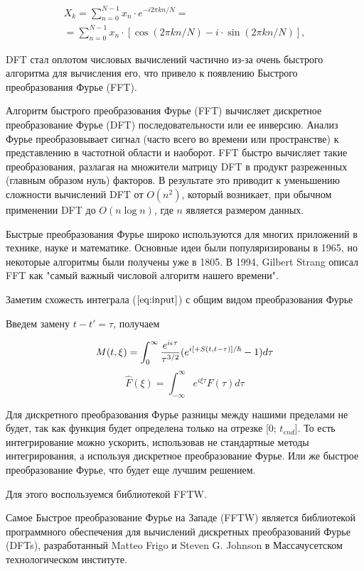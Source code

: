 \documentclass[14pt]{extarticle}
\begin{document}
$$\begin{aligned}X_{k}=\sum _{n=0}^{N-1}x_{n}\cdot e^{-i2\pi kn/N}=\\=\sum _{n=0}^{N-1}x_{n}\cdot [\cos(2\pi kn/N)-i\cdot \sin(2\pi kn/N)],\end{aligned}$$	


DFT стал оплотом числовых вычислений частично из-за очень быстрого алгоритма для вычисления его, что привело к появлению Быстрого преобразования Фурье (FFT).

Алгоритм быстрого преобразования Фурье (FFT) вычисляет дискретное преобразование Фурье (DFT) последовательности или ее инверсию. Анализ Фурье преобразовывает сигнал (часто всего во времени или пространстве) к представлению в частотной области и наоборот. FFT быстро вычисляет такие преобразования, разлагая на множители матрицу DFT в продукт разреженных (главным образом нуль) факторов. В результате это приводит к уменьшению сложности вычислений DFT от $ O (n^ {2})$, который возникает, при обычном применении DFT до $O (n\log n)$, где $ n $  является размером данных.

Быстрые преобразования Фурье широко используются для многих приложений в технике, науке и математике. Основные идеи были популяризированы в 1965, но некоторые алгоритмы были получены уже в 1805. В 1994, Gilbert Strang описал FFT как "самый важный числовой алгоритм нашего времени".

Заметим схожесть интеграла ($\ref{eq:input}$) с общим видом преобразования Фурье

Введем замену $t - t' = \tau$, получаем

\begin{equation}\label{eq:fourier}
	M(t, \xi) = \int_{0}^{\infty}\frac{e^{i\epsilon \tau}}{{\tau}^{3/2}}(e^{i [+ S(t, t-\tau)]/\hbar} - 1) d\tau\\ 
\end{equation}
$$\hat{F}(\xi) = \int_{-\infty}^{\infty}e^{i\xi \tau} F(\tau) d\tau $$

Для дискретного преобразования Фурье разницы между нашими пределами не будет, так как функция будет определена только на отрезке [0; $t_{end}$].
То есть интегрирование можно ускорить, использовав не стандартные методы интегрирования, а используя дискретное преобразование Фурье. Или же быстрое преобразование Фурье, что будет еще лучшим решением.

Для этого воспользуемся библиотекой FFTW.

Самое Быстрое преобразование Фурье на Западе (FFTW) является библиотекой программного обеспечения для вычислений дискретных преобразований Фурье (DFTs), разработанный Matteo Frigo и Steven G. Johnson в Массачусетском технологическом институте.
\end{document}
